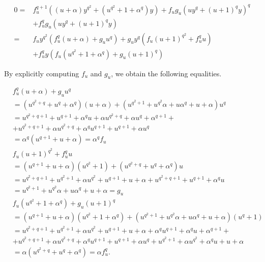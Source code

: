 \documentclass[10pt]{article}
\begin{document}
$$
\begin{aligned}
0= & f_{u}^{q+1}\left((u+\alpha) y^{q^{2}}+\left(u^{q^{2}}+1+\alpha^{q}\right) y\right)+f_{u} g_{u}\left(u y^{q}+(u+1)^{q} y\right)^{q} \\
& +f_{u}^{q} g_{u}\left(u y^{q}+(u+1)^{q} y\right) \\
= & f_{u} y^{q^{2}}\left(f_{u}^{q}(u+\alpha)+g_{u} u^{q}\right)+g_{u} y^{q}\left(f_{u}(u+1)^{q^{2}}+f_{u}^{q} u\right) \\
& +f_{u}^{q} y\left(f_{u}\left(u^{q^{2}}+1+\alpha^{q}\right)+g_{u}(u+1)^{q}\right)
\end{aligned}
$$

By explicitly computing $f_{u}$ and $g_{u}$, we obtain the following equalities.

$$
\begin{aligned}
& f_{u}^{q}(u+\alpha)+g_{u} u^{q} \\
&=\left(u^{q^{2}+q}+u^{q}+\alpha^{q}\right)(u+\alpha)+\left(u^{q^{2}+1}+u^{q^{2}} \alpha+u \alpha^{q}+u+\alpha\right) u^{q} \\
&= u^{q^{2}+q+1}+u^{q+1}+\alpha^{q} u+\alpha u^{q^{2}+q}+\alpha u^{q}+\alpha^{q+1}+ \\
&+u^{q^{2}+q+1}+\alpha u^{q^{2}+q}+\alpha^{q} u^{q+1}+u^{q+1}+\alpha u^{q} \\
&= \alpha^{q}\left(u^{q+1}+u+\alpha\right)=\alpha^{q} f_{u} \\
& f_{u}(u+1)^{q^{2}}+f_{u}^{q} u \\
&=\left(u^{q+1}+u+\alpha\right)\left(u^{q^{2}}+1\right)+\left(u^{q^{2}+q}+u^{q}+\alpha^{q}\right) u \\
&= u^{q^{2}+q+1}+u^{q^{2}+1}+\alpha u^{q^{2}}+u^{q+1}+u+\alpha+u^{q^{2}+q+1}+u^{q+1}+\alpha^{q} u \\
&= u^{q^{2}+1}+u^{q^{2}} \alpha+u \alpha^{q}+u+\alpha=g_{u} \\
& f_{u}\left(u^{q^{2}}+1+\alpha^{q}\right)+g_{u}(u+1)^{q} \\
&=\left(u^{q+1}+u+\alpha\right)\left(u^{q^{2}}+1+\alpha^{q}\right)+\left(u^{q^{2}+1}+u^{q^{2}} \alpha+u \alpha^{q}+u+\alpha\right)\left(u^{q}+1\right) \\
&= u^{q^{2}+q+1}+u^{q^{2}+1}+\alpha u^{q^{2}}+u^{q+1}+u+\alpha+\alpha^{q} u^{q+1}+\alpha^{q} u+\alpha^{q+1}+ \\
&+u^{q^{2}+q+1}+\alpha u^{q^{2}+q}+\alpha^{q} u^{q+1}+u^{q+1}+\alpha u^{q}+u^{q^{2}+1}+\alpha u^{q^{2}}+\alpha^{q} u+u+\alpha \\
&= \alpha\left(u^{q^{2}+q}+u^{q}+\alpha^{q}\right)=\alpha f_{u}^{q} .
\end{aligned}
$$
\end{document}
